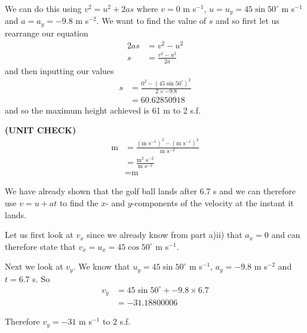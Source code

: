 \documentclass[a4paper,12pt]{article}
\numberwithin{equation}{section}
\begin{document}
\begin{question}
We can do this using $v^2 = u^2 + 2as$ where $v = 0$ m s$^{-1}$, $u = u_y = 45\sin50^\circ$ m s$^{-1}$ and $a = a_y = -9.8$ m s$^{-2}$. We want to find the value of $s$ and so first let us rearrange our equation
\begin{align*}
2as &= v^2 - u^2\\
s &= \frac{v^2 - u^2}{2a}
\end{align*}
and then inputting our values
\begin{align*}
s &= \frac{0^2 - (45\sin50^\circ)^2}{2\times-9.8}\\
&= 60.62850918
\end{align*}
and so the maximum height achieved is 61 m to 2 s.f.

\textbf{(UNIT CHECK)}
\begin{align*}
\text{m} &= \frac{(\text{m s}^{-1})^2 - (\text{m s}^{-1})^2}{\text{m s}^{-2}}\\
&=\frac{\text{m}^2\text{ s}^{-2}}{\text{m s}^{-2}}\\
&=\text{m}
\end{align*}

\newpage

\qsubpart
We have already shown that the golf ball lands after 6.7 s and we can therefore use $v = u + at$ to find the $x$- and $y$-components of the velocity at the instant it lands.

Let us first look at $v_x$ since we already know from part a)ii) that $a_x=0$ and can therefore state that $v_x = u_x = 45\cos50^\circ$ m s$^{-1}$.

Next we look at $v_y$. We know that $u_y = 45\sin50^\circ$  m s$^{-1}$, $a_y = -9.8$ m s$^{-2}$ and $t = 6.7$ s. So
\begin{align*}
v_y&=45\sin50^\circ + -9.8\times6.7\\
&=-31.18800006
\end{align*}

Therefore $v_y=-31$  m s$^{-1}$ to 2 s.f.


\end{question}
\end{document}
